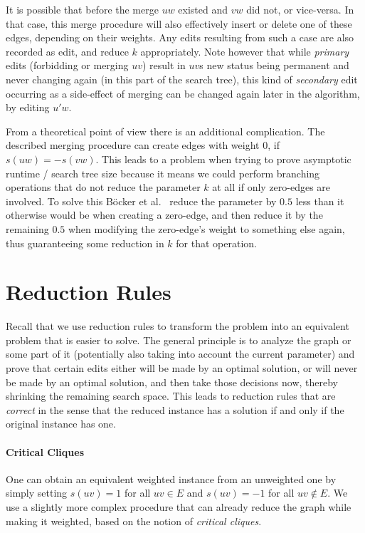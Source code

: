 \documentclass[12pt,oneside,english,parskip=full,headings=small]{scrbook}
\theoremstyle{definition}
\begin{document}
It is possible that before the merge $uw$ existed and $vw$ did not, or vice-versa. In that case,
this merge procedure will also effectively insert or delete one of these edges, depending on their
weights. Any edits resulting from such a case are also recorded as edit, and reduce $k$
appropriately. Note however that while \emph{primary} edits (forbidding or merging $uv$) result in
$uv$s new status being permanent and never changing again (in this part of the search tree), this
kind of \emph{secondary} edit occurring as a side-effect of merging can be changed again later in
the algorithm, by editing $u'w$.

From a theoretical point of view there is an additional complication. The described merging
procedure can create edges with weight $0$, if $s(uw) = -s(vw)$. This leads to a problem when trying
to prove asymptotic runtime / search tree size because it means we could perform branching
operations that do not reduce the parameter $k$ at all if only zero-edges are involved. To solve
this Böcker et al.~\cite{GoingWeighted} reduce the parameter by $0.5$ less than it otherwise would
be when creating a zero-edge, and then reduce it by the remaining $0.5$ when modifying the
zero-edge's weight to something else again, thus guaranteeing some reduction in $k$ for that
operation.

\section{Reduction Rules}
\label{sec:reduction}

Recall that we use reduction rules to transform the problem into an equivalent problem that is
easier to solve. The general principle is to analyze the graph or some part of it (potentially also
taking into account the current parameter) and prove that certain edits either will be made by an
optimal solution, or will never be made by an optimal solution, and then take those decisions now,
thereby shrinking the remaining search space. This leads to reduction rules that are \emph{correct}
in the sense that the reduced instance has a solution if and only if the original instance has one.

\paragraph{Critical Cliques} One can obtain an equivalent weighted instance from an unweighted one
by simply setting $s(uv) = 1$ for all $uv \in E$ and $s(uv) = -1$ for all $uv \notin E$. We use a
slightly more complex procedure that can already reduce the graph while making it weighted, based on
the notion of \emph{critical cliques}.
\end{document}
